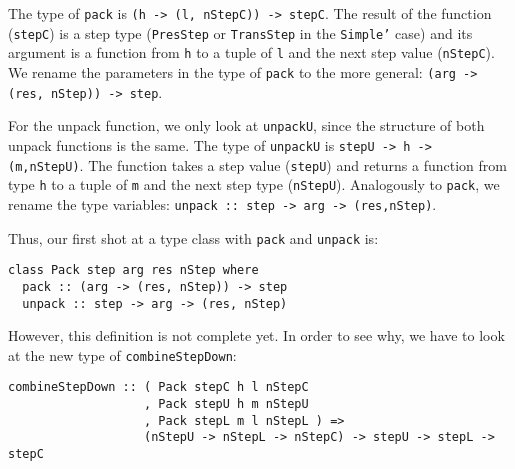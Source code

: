\par The type of \texttt{pack} is \texttt{(h -> (l, nStepC)) ->
        stepC}. The result of the function (\texttt{stepC}) is a step type
        (\texttt{PresStep} or \texttt{TransStep} in the \texttt{Simple'} case) and its
        argument is a function from \texttt{h} to a tuple of \texttt{l} and the next
        step value (\texttt{nStepC}). We rename the parameters in the type of
        \texttt{pack} to the more general: \texttt{(arg -> (res, nStep)) ->
        step}.
\par For the unpack function, we only look at \texttt{unpackU}, since the
        structure of both unpack functions is the same. The type of \texttt{unpackU} is
        \texttt{stepU -> h -> (m,nStepU)}. The function takes a step value
        (\texttt{stepU}) and returns a function from type \texttt{h} to a tuple of
        \texttt{m} and the next step type (\texttt{nStepU}). Analogously to
        \texttt{pack}, we rename the type variables: \texttt{unpack :: step -> arg ->
        (res,nStep)}. 
\par Thus, our first shot at a type class with \texttt{pack} and
        \texttt{unpack} is:\begin{small}\begin{verbatim}class Pack step arg res nStep where
  pack :: (arg -> (res, nStep)) -> step
  unpack :: step -> arg -> (res, nStep)\end{verbatim}\end{small}

\par However, this definition is not complete yet. In order to see why, we
        have to look at the new type of \texttt{combineStepDown}:\begin{small}\begin{verbatim}combineStepDown :: ( Pack stepC h l nStepC 
                   , Pack stepU h m nStepU
                   , Pack stepL m l nStepL ) => 
                   (nStepU -> nStepL -> nStepC) -> stepU -> stepL -> stepC\end{verbatim}\end{small}

